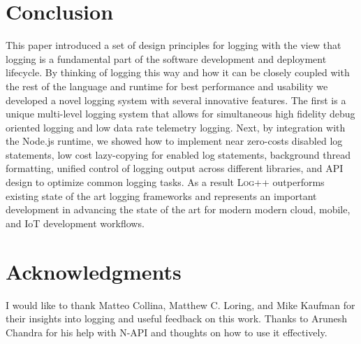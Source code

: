 \documentclass[sigplan,10pt,review]{acmart}
\newcommand{\projn}{\textsc{Log++}\xspace}
\begin{document}
\section{Conclusion}
This paper introduced a set of design principles for logging with the view that 
logging is a fundamental part of the software development and deployment lifecycle. 
By thinking of logging this way and how it can be closely coupled with the rest of the 
language and runtime for best performance and usability we developed a novel logging 
system with several innovative features. The first is a unique multi-level logging 
system that allows for simultaneous high fidelity debug oriented logging and low data 
rate telemetry logging. Next, by integration with the Node.js runtime, we showed how 
to implement near zero-costs disabled log statements, low cost lazy-copying 
for enabled log statements, background thread formatting, unified control 
of logging output across different libraries, and API design to optimize common logging 
tasks. As a result \projn outperforms existing state of the art logging frameworks and 
represents an important development in advancing the state of the art for 
modern modern cloud, mobile, and IoT development workflows.

\section*{Acknowledgments}
I would like to thank Matteo Collina, Matthew C. Loring, and Mike Kaufman for their insights into logging and 
useful feedback on this work. Thanks to Arunesh Chandra for his help with N-API and thoughts on how to 
use it effectively.

\balance

{
\raggedright 

 
}
\end{document}
